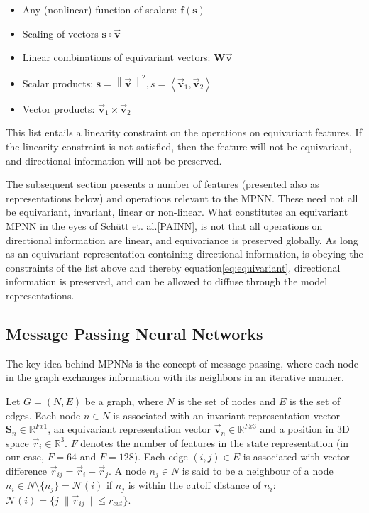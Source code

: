 \begin{itemize}
    \item Any (nonlinear) function of scalars: $\mathbf{f}(\mathbf{s})$
    \item Scaling of vectors $ \mathbf{s} \circ \vec{\mathbf{v}}$
    \item Linear combinations of equivariant vectors: $\mathbf{W} \vec{\mathbf{v}}$
    \item Scalar products: $\mathbf{s} = \left \| \vec{\mathbf{v}} \right \|^{2}, s = \left \langle \vec{\mathbf{v}}_{1}, \vec{\mathbf{v}}_{2} \right \rangle$
    \item Vector products: $\vec{\mathbf{v}}_{1} \times \vec{\mathbf{v}}_{2}$
\end{itemize}

This list entails a linearity constraint on the operations on equivariant features\cite{PAINN}. If the linearity constraint is
not satisfied, then the feature will not be equivariant, and directional information will not be preserved.

The subsequent section presents
a number of features (presented also as representations below) and operations relevant to the MPNN.
These need not all be equivariant, invariant, linear or non-linear. What constitutes an equivariant MPNN in the eyes of
Schütt et. al.\ref{PAINN}, is not that all operations on directional information are linear, and equivariance is preserved globally.
As long as an equivariant representation containing directional information, is obeying  the constraints of the list above and thereby
equation\ref{eq:equivariant}, directional information is preserved, and can be allowed to diffuse through the model representations.

\subsection{Message Passing Neural Networks}\label{subsec:modelling_task}

The key idea behind MPNNs is the concept of
message passing, where each node in the graph exchanges information with its neighbors in an iterative manner.

Let $G = (N, E)$ be a graph, where $N$ is the set of nodes and $E$ is the set of edges.
Each node $n \in N$ is associated with an invariant representation vector $\mathbf{S}_{n} \in \mathbb{R}^{Fx1}$,
an equivariant representation
vector $\vec{\mathbf{v}}_{n} \in \mathbb{R}^{Fx3}$ and a position in 3D space $\vec{r}_{i} \in \mathbb{R}^3$.
$F$ denotes the number of features in the state representation (in our case, $F = 64$ and $F = 128$).
Each edge $(i, j) \in E$ is associated with vector difference $\vec{r}_{ij} = \vec{r}_{i} - \vec{r}_{j}$.
A node $n_{j} \in N$ is said to be a neighbour of a node $n_{i} \in N \setminus \{n_{j}\} = \mathcal{N}(i) $
if $n_{j}$ is within the cutoff distance of $n_{i}$: $\mathcal{N}(i) = \{j |\lVert \vec{r}_{ij} \rVert \leq r_{cut}  \}$.


